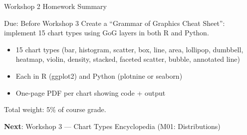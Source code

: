 \documentclass[10pt]{beamer}
\begin{document}
\begin{frame}{Workshop 2 Homework Summary}
  \begin{alertblock}{Due: Before Workshop 3}
    Create a ``Grammar of Graphics Cheat Sheet'': implement 15 chart
    types using GoG layers in both R and Python.
    \begin{itemize}
      \item 15 chart types (bar, histogram, scatter, box, line, area,
            lollipop, dumbbell, heatmap, violin, density, stacked,
            faceted scatter, bubble, annotated line)
      \item Each in R (ggplot2) and Python (plotnine or seaborn)
      \item One-page PDF per chart showing code + output
    \end{itemize}
    Total weight: 5\% of course grade.
  \end{alertblock}
  \vspace{4pt}
  \textbf{Next}: Workshop 3 --- Chart Types Encyclopedia (M01: Distributions)
\end{frame}
\end{document}
